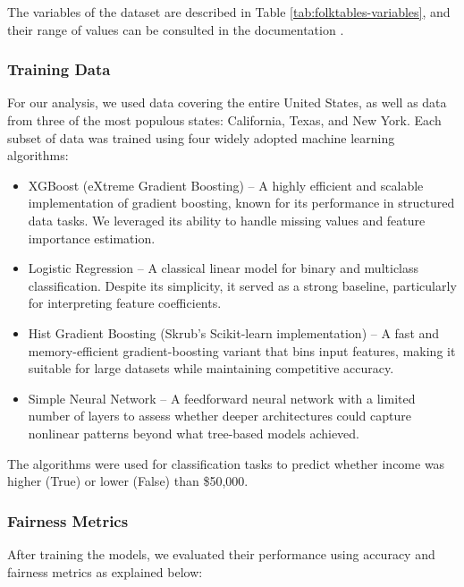 The variables of the dataset are described in Table \ref{tab:folktables-variables}, and their range of values can be consulted in the documentation \cite{folktables-ding}.



\subsubsection{Training Data}
For our analysis, we used data covering the entire United States, as well as data from three of the most populous states: California, Texas, and New York. Each subset of data was trained using four widely adopted machine learning algorithms:

\begin{itemize}
	\item XGBoost (eXtreme Gradient Boosting) – A highly efficient and scalable implementation of gradient boosting, known for its performance in structured data tasks. We leveraged its ability to handle missing values and feature importance estimation.
	
	\item Logistic Regression – A classical linear model for binary and multiclass classification. Despite its simplicity, it served as a strong baseline, particularly for interpreting feature coefficients.
	
	\item Hist Gradient Boosting (Skrub's Scikit-learn implementation) – A fast and memory-efficient gradient-boosting variant that bins input features, making it suitable for large datasets while maintaining competitive accuracy.
	
	\item Simple Neural Network – A feedforward neural network with a limited number of layers to assess whether deeper architectures could capture nonlinear patterns beyond what tree-based models achieved.
\end{itemize}


The algorithms were used for classification tasks to predict whether income was higher (True) or lower (False) than \$50,000.

\subsubsection{Fairness Metrics}
After training the models, we evaluated their performance using accuracy and fairness metrics as explained below:

